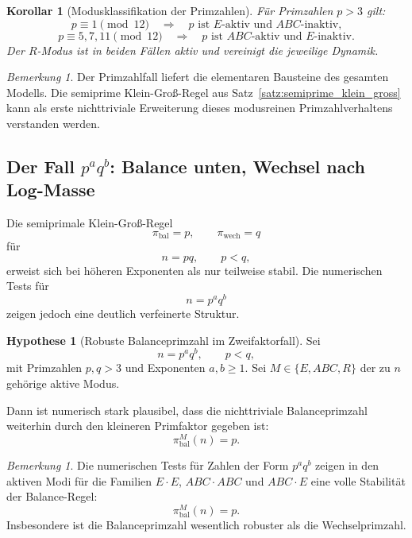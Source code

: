 \documentclass[11pt,a4paper]{article}
\newtheorem{korollar}[satz]{Korollar}
\theoremstyle{definition}
\newtheorem{hypothese}[satz]{Hypothese}
\theoremstyle{remark}
\newtheorem{bemerkung}[satz]{Bemerkung}
\begin{document}
	\begin{korollar}[Modusklassifikation der Primzahlen]
		\label{kor:modusklassifikation_primzahlen}
		Für Primzahlen \(p>3\) gilt:
		\[
		p\equiv 1\pmod{12}
		\quad\Longrightarrow\quad
		\text{\(p\) ist \(E\)-aktiv und \(ABC\)-inaktiv,}
		\]
		\[
		p\equiv 5,7,11\pmod{12}
		\quad\Longrightarrow\quad
		\text{\(p\) ist \(ABC\)-aktiv und \(E\)-inaktiv.}
		\]
		Der \(R\)-Modus ist in beiden Fällen aktiv und vereinigt die jeweilige Dynamik.
	\end{korollar}
	
	\begin{bemerkung}
		Der Primzahlfall liefert die elementaren Bausteine des gesamten Modells. Die
		semiprime Klein-Groß-Regel aus Satz~\ref{satz:semiprime_klein_gross} kann als
		erste nichttriviale Erweiterung dieses modusreinen Primzahlverhaltens verstanden
		werden.
	\end{bemerkung}
	
	\subsection{Der Fall \(p^a q^b\): Balance unten, Wechsel nach Log-Masse}
	
	Die semiprimale Klein-Groß-Regel
	\[
	\pi_{\mathrm{bal}}=p,\qquad \pi_{\mathrm{wech}}=q
	\]
	für
	\[
	n=pq,\qquad p<q,
	\]
	erweist sich bei höheren Exponenten als nur teilweise stabil. Die numerischen Tests für
	\[
	n=p^a q^b
	\]
	zeigen jedoch eine deutlich verfeinerte Struktur.
	
	\begin{hypothese}[Robuste Balanceprimzahl im Zweifaktorfall]
		\label{hyp:paqb_balance}
		Sei
		\[
		n=p^a q^b,\qquad p<q,
		\]
		mit Primzahlen \(p,q>3\) und Exponenten \(a,b\ge 1\). Sei \(M\in\{E,ABC,R\}\) der
		zu \(n\) gehörige aktive Modus.
		
		Dann ist numerisch stark plausibel, dass die nichttriviale Balanceprimzahl weiterhin durch
		den kleineren Primfaktor gegeben ist:
		\[
		\pi_{\mathrm{bal}}^{M}(n)=p.
		\]
	\end{hypothese}
	
	\begin{bemerkung}
		Die numerischen Tests für Zahlen der Form \(p^a q^b\) zeigen in den aktiven Modi für die
		Familien \(E\cdot E\), \(ABC\cdot ABC\) und \(ABC\cdot E\) eine volle Stabilität der
		Balance-Regel:
		\[
		\pi_{\mathrm{bal}}^{M}(n)=p.
		\]
		Insbesondere ist die Balanceprimzahl wesentlich robuster als die Wechselprimzahl.
	\end{bemerkung}
	
\end{document}
